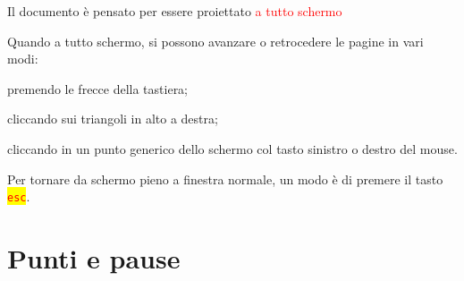 \documentclass[italian,landscape]{report}
\newcommand{\rosso}[1]{\textcolor{red}{#1}}
\newcommand{\sfondogiallo}[1]{\colorbox{yellow}{#1}}
\begin{document}
\begin{firstheadlineitemize}

\item Il documento \`e pensato per essere proiettato \rosso{a tutto schermo}

\pause

\begin{secondheadlineitemize}

\item Quando a tutto schermo, si possono avanzare o retrocedere le pagine in vari modi:


\begin{thirdheadlineitemize}

\pause

\item premendo le frecce della tastiera;

\pause

\item cliccando sui triangoli \indietro{} \avanti{} in alto a destra;

\pause

\item cliccando in un punto generico dello schermo col tasto sinistro o destro del mouse.

\end{thirdheadlineitemize}

\pause

\item Per tornare da schermo pieno a finestra normale, un modo \`e di premere il tasto \sfondogiallo{\rosso{\texttt{esc}}}.

\end{secondheadlineitemize}

\end{firstheadlineitemize}

\section{Punti e pause}
\end{document}
